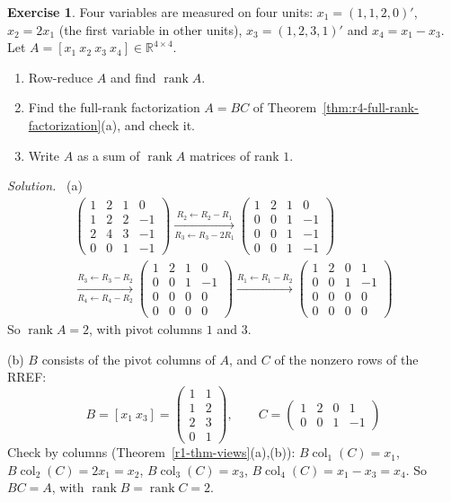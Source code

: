\documentclass[12pt]{article}
\newcommand{\R}{\mathbb R}
\DeclareMathOperator{\col}{col}
\DeclareMathOperator{\rank}{rank}
\theoremstyle{definition}
\newtheorem{exercise}{Exercise}
\newenvironment{solution}{\par\noindent\textit{Solution.}\ }{\par\smallskip}
\begin{document}
\begin{exercise}\label{r4-dr-factorization}
Four variables are measured on four units: \(x_1=(1,1,2,0)'\), \(x_2=2x_1\) (the first variable in other units),
\(x_3=(1,2,3,1)'\) and \(x_4=x_1-x_3\). Let \(A=[x_1\ x_2\ x_3\ x_4]\in\R^{4\times4}\).
\begin{enumerate}
\item Row-reduce \(A\) and find \(\rank A\).
\item Find the full-rank factorization \(A=BC\) of Theorem~\ref{thm:r4-full-rank-factorization}(a), and check it.
\item Write \(A\) as a sum of \(\rank A\) matrices of rank \(1\).
\end{enumerate}
\end{exercise}
\begin{solution}
(a)
\[
\begin{gathered}
\begin{pmatrix}1&2&1&0\\1&2&2&-1\\2&4&3&-1\\0&0&1&-1\end{pmatrix}
\xrightarrow[R_3\leftarrow R_3-2R_1]{R_2\leftarrow R_2-R_1}
\begin{pmatrix}1&2&1&0\\0&0&1&-1\\0&0&1&-1\\0&0&1&-1\end{pmatrix}
\\
\xrightarrow[R_4\leftarrow R_4-R_2]{R_3\leftarrow R_3-R_2}
\begin{pmatrix}1&2&1&0\\0&0&1&-1\\0&0&0&0\\0&0&0&0\end{pmatrix}
\xrightarrow{R_1\leftarrow R_1-R_2}
\begin{pmatrix}1&2&0&1\\0&0&1&-1\\0&0&0&0\\0&0&0&0\end{pmatrix}
\end{gathered}
\]
So \(\rank A=2\), with pivot columns \(1\) and \(3\).

(b) \(B\) consists of the pivot columns of \(A\), and \(C\) of the nonzero rows of the RREF:
\[
B=[x_1\ x_3]=\begin{pmatrix}1&1\\1&2\\2&3\\0&1\end{pmatrix},\qquad C=\begin{pmatrix}1&2&0&1\\0&0&1&-1\end{pmatrix}
\]
Check by columns (Theorem~\ref{r1-thm-views}(a),(b)): \(B\col_1(C)=x_1\), \(B\col_2(C)=2x_1=x_2\),
\(B\col_3(C)=x_3\), \(B\col_4(C)=x_1-x_3=x_4\). So \(BC=A\), with \(\rank B=\rank C=2\).


\end{solution}
\end{document}
